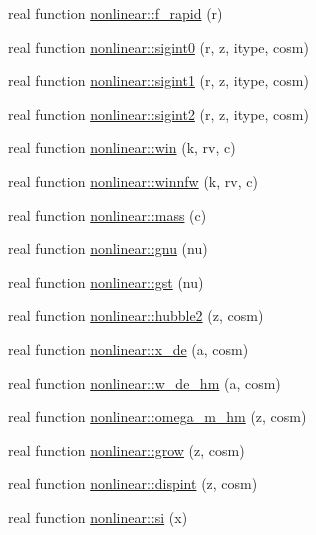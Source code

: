 \begin{DoxyCompactItemize}
\item 
real function \mbox{\hyperlink{namespacenonlinear_a2a0c300b39b9de3d6b00be6369b59944}{nonlinear\+::f\+\_\+rapid}} (r)
\item 
real function \mbox{\hyperlink{namespacenonlinear_ad4ec869211d722d92d942360f0619e6e}{nonlinear\+::sigint0}} (r, z, itype, cosm)
\item 
real function \mbox{\hyperlink{namespacenonlinear_ac0dc62ceea1e6ba2e1b7a08a420d934e}{nonlinear\+::sigint1}} (r, z, itype, cosm)
\item 
real function \mbox{\hyperlink{namespacenonlinear_a7f3d1c8e1e8b16f59cf8a1d0b6cd5499}{nonlinear\+::sigint2}} (r, z, itype, cosm)
\item 
real function \mbox{\hyperlink{namespacenonlinear_a35d90b214ebbc4ed47ee2a0b00533081}{nonlinear\+::win}} (k, rv, c)
\item 
real function \mbox{\hyperlink{namespacenonlinear_ad0e2241407de1974edb07a5990f12ba3}{nonlinear\+::winnfw}} (k, rv, c)
\item 
real function \mbox{\hyperlink{namespacenonlinear_acce5a3564ba00c26a8a5674ab63d5b73}{nonlinear\+::mass}} (c)
\item 
real function \mbox{\hyperlink{namespacenonlinear_a236c113538d97686a8f8e286b29bc073}{nonlinear\+::gnu}} (nu)
\item 
real function \mbox{\hyperlink{namespacenonlinear_a5eea788fe3f505d256438cee66af3240}{nonlinear\+::gst}} (nu)
\item 
real function \mbox{\hyperlink{namespacenonlinear_a82f340c9a9b18e3f45b2ddbe518cebba}{nonlinear\+::hubble2}} (z, cosm)
\item 
real function \mbox{\hyperlink{namespacenonlinear_a316db4addf8f1f544ab3c08ba97fbeb9}{nonlinear\+::x\+\_\+de}} (a, cosm)
\item 
real function \mbox{\hyperlink{namespacenonlinear_acb781fcdfe31fdfcd54337c5fc827fb2}{nonlinear\+::w\+\_\+de\+\_\+hm}} (a, cosm)
\item 
real function \mbox{\hyperlink{namespacenonlinear_ac515b61587eefa54d1ebc904d0ef78b6}{nonlinear\+::omega\+\_\+m\+\_\+hm}} (z, cosm)
\item 
real function \mbox{\hyperlink{namespacenonlinear_a1870caf0d38a1c6617ca3ef8de2f6947}{nonlinear\+::grow}} (z, cosm)
\item 
real function \mbox{\hyperlink{namespacenonlinear_ae44a5c4f7412d42923e10f9a241d2e74}{nonlinear\+::dispint}} (z, cosm)
\item 
real function \mbox{\hyperlink{namespacenonlinear_a6171546fb42a0d5c085c3ee5c8662e0b}{nonlinear\+::si}} (x)

\end{DoxyCompactItemize}
